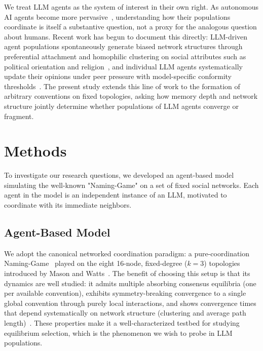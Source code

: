 \documentclass{article}
\begin{document}
We treat LLM agents as the system of interest in their own right. As autonomous AI agents become more pervasive~\cite{molinari2025towards,jiang2026humans,acharya2025agentic}, understanding how their populations coordinate is itself a substantive question, not a proxy for the analogous question about humans. Recent work has begun to document this directly: LLM-driven agent populations spontaneously generate biased network structures through preferential attachment and homophilic clustering on social attributes such as political orientation and religion~\cite{mehdizadeh2025homophily}, and individual LLM agents systematically update their opinions under peer pressure with model-specific conformity thresholds~\cite{mehdizadeh2025your}. The present study extends this line of work to the formation of arbitrary conventions on fixed topologies, asking how memory depth and network structure jointly determine whether populations of LLM agents converge or fragment.

\section{Methods}

To investigate our research questions, we developed an agent-based model simulating the well-known "Naming-Game" on a set of fixed social networks. Each agent in the model is an independent instance of an LLM, motivated to coordinate with its immediate neighbors.

\subsection{Agent-Based Model}

We adopt the canonical networked coordination paradigm: a pure-coordination Naming-Game~\cite{baronchelli2006sharp,baronchelli2018emergence,centola2015spontaneous} played on the eight 16-node, fixed-degree ($k=3$) topologies introduced by Mason and Watts~\cite{mason2012collaborative}. The benefit of choosing this setup is that its dynamics are well studied: it admits multiple absorbing consensus equilibria (one per available convention), exhibits symmetry-breaking convergence to a single global convention through purely local interactions, and shows convergence times that depend systematically on network structure (clustering and average path length)~\cite{dallasta2006nonequilibrium,baronchelli2018emergence}. These properties make it a well-characterized testbed for studying equilibrium selection, which is the phenomenon we wish to probe in LLM populations.
\end{document}
